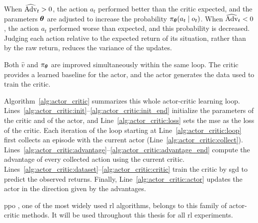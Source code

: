 When \(\widehat{\mathrm{Adv}}_t > 0\), the action \(a_t\) performed better than the critic expected, and the parameters \(\boldsymbol{\theta}\) are adjusted to increase the probability \(\pi_{\boldsymbol{\theta}}(a_t \mid o_t)\).
When \(\widehat{\mathrm{Adv}}_t < 0\), the action \(a_t\) performed worse than expected, and this probability is decreased.
Judging each action relative to the expected return of its situation, rather than by the raw return, reduces the variance of the updates.

Both \(\hat{v}\) and \(\pi_{\boldsymbol{\theta}}\) are improved simultaneously within the same loop.
The critic provides a learned baseline for the actor, and the actor generates the data used to train the critic.

Algorithm~\ref{alg:actor_critic} summarizes this whole actor-critic learning loop.
Lines~\ref{alg:actor_critic:init}--\ref{alg:actor_critic:init_end} initialize the parameters of the critic and of the actor, and Line~\ref{alg:actor_critic:loss} sets the \gls{mse} as the loss of the critic.
Each iteration of the loop starting at Line~\ref{alg:actor_critic:loop} first collects an episode with the current actor (Line~\ref{alg:actor_critic:collect}).
Lines~\ref{alg:actor_critic:advantage}--\ref{alg:actor_critic:advantage_end} compute the advantage of every collected action using the current critic.
Lines~\ref{alg:actor_critic:dataset}--\ref{alg:actor_critic:critic} train the critic by \gls{sgd} to predict the observed returns.
Finally, Line~\ref{alg:actor_critic:actor} updates the actor in the direction given by the advantages.



\gls{ppo} \parencite{schulman2017proximalpolicyoptimizationalgorithms}, one of the most widely used \gls{rl} algorithms, belongs to this family of actor-critic methods.
It will be used throughout this thesis for all \gls{rl} experiments.
